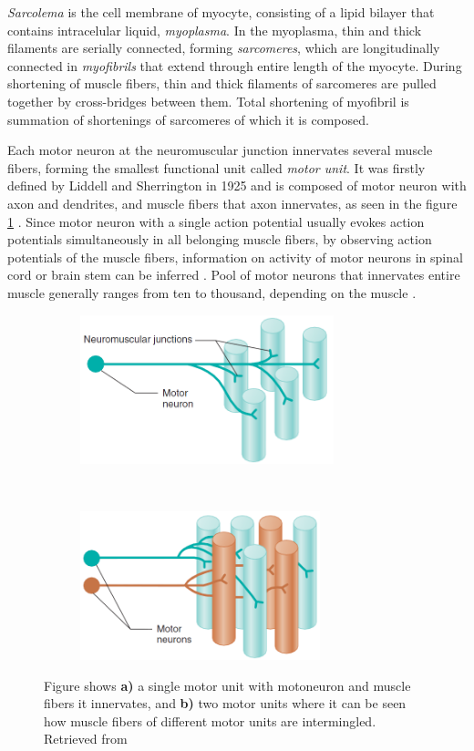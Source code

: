 \emph{Sarcolema} is the cell membrane of myocyte, consisting of a lipid bilayer that contains intracelular liquid, \emph{myoplasma}. In the myoplasma, thin and thick filaments are serially connected, forming \emph{sarcomeres}, which are longitudinally connected in \emph{myofibrils} that extend through entire length of the myocyte. During shortening of muscle fibers, thin and thick filaments of sarcomeres are pulled together by cross-bridges between them. Total shortening of myofibril is summation of shortenings of sarcomeres of which it is composed.

Each motor neuron at the neuromuscular junction innervates several muscle fibers, forming the smallest functional unit called \emph{motor unit}. It was firstly defined by Liddell and Sherrington in 1925 \citep{Liddell1925, Sherrington1925} and is composed of motor neuron with axon and dendrites, and muscle fibers that axon innervates, as seen in the figure \ref{fig:motor units} \citep{Duchateau2011}. Since motor neuron with a single action potential usually evokes action potentials simultaneously in all belonging muscle fibers, by observing action potentials of the muscle fibers, information on activity of motor neurons in spinal cord or brain stem can be inferred \citep{Merletti-Farina-book}. Pool of motor neurons that innervates entire muscle generally ranges from ten to thousand, depending on the muscle \citep{Merletti-Farina-book}.
\begin{figure}[t!]
    \centering
    \begin{subfigure}[t]{0.49\textwidth}
        \centering
        \includegraphics[height=1.7in]{Images/introduction/one_MU.png}
        \caption{}
    \end{subfigure}%
    ~ 
    \begin{subfigure}[t]{0.49\textwidth}
        \centering
        \includegraphics[height=1.7in]{Images/introduction/two_MU.png}
        \caption{}
    \end{subfigure}
    \caption{Figure shows \textbf{a)} a single motor unit with motoneuron and muscle fibers it innervates, and \textbf{b)} two motor units where it can be seen how muscle fibers of different motor units are intermingled. Retrieved from \citep{Widmaier2014}}
\label{fig:motor units}
\end{figure}



